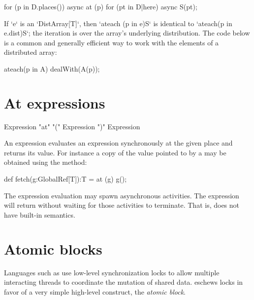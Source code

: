 \begin{xten}
for (p in D.places()) async at (p) {
    for (pt in D|here) async {
        S(pt);
    }
}
\end{xten}

If \xcd`e` is an \xcd`DistArray[T]`, then \xcd`ateach (p in e)S` is identical to
\xcd`ateach(p in e.dist)S`; the iteration is over the array's underlying
distribution.   
The code below is a common and generally efficient way to work with the
elements of a distributed array:
\begin{xten}
ateach(p in A) 
  dealWith(A(p));
\end{xten}








\section{At expressions}

\begin{grammar}
Expression \: \xcd"at" \xcd"(" Expression \xcd")" Expression
\end{grammar}

An  expression evaluates an expression synchronously at the
given place and returns its value.  For instance a copy of the
value pointed to by a  may be obtained using
the  method:
\begin{xten}
  def fetch(g:GlobalRef[T]):T = at (g) g();
\end{xten}

The expression evaluation may spawn asynchronous activities. The 
expression will return without waiting for those activities to terminate. That
is,  does not have built-in  semantics.

\section{Atomic blocks}\label{AtomicBlocks}
Languages such as \java{} use low-level synchronization locks to allow
multiple interacting threads to coordinate the mutation of shared
data. \Xten{} eschews locks in favor of a very simple high-level
construct, the {\em atomic block}.

